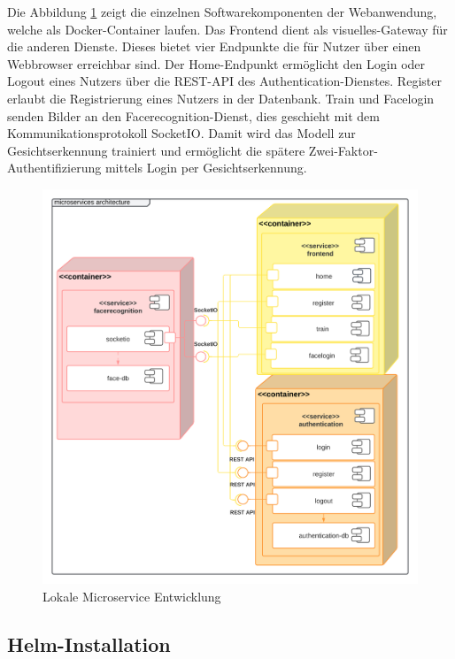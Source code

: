 Die Abbildung \ref{fig:UML-Microservices} zeigt die einzelnen Softwarekomponenten der Webanwendung, welche als Docker-Container laufen.
Das Frontend dient als visuelles-Gateway für die anderen Dienste.
Dieses bietet vier Endpunkte die für Nutzer über einen Webbrowser erreichbar sind.
Der Home-Endpunkt ermöglicht den Login oder Logout eines Nutzers über die REST-API des Authentication-Dienstes.
Register erlaubt die Registrierung eines Nutzers in der Datenbank.
Train und Facelogin senden Bilder an den Facerecognition-Dienst, dies geschieht mit dem Kommunikationsprotokoll SocketIO.
Damit wird das Modell zur Gesichtserkennung trainiert und ermöglicht die spätere Zwei-Faktor-Authentifizierung mittels Login per Gesichtserkennung.


\begin{figure}[!htb]
    \centering
    \includegraphics[width=1.0\columnwidth]{images/UML-Microservices-Diagramm.png}
    \caption{Lokale Microservice Entwicklung}
    \label{fig:UML-Microservices}
\end{figure}




\subsection{Helm-Installation}

